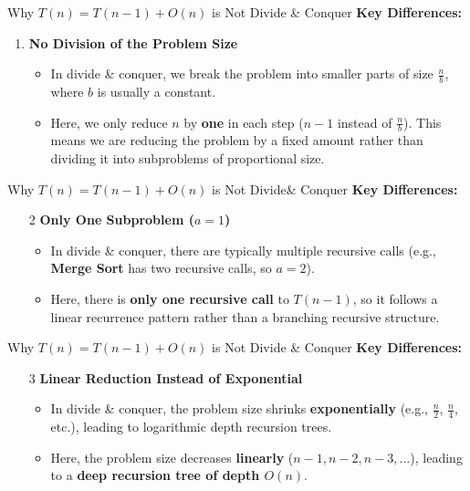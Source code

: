 \documentclass{beamer}
\begin{document}
\begin{frame}{Why $T(n) = T(n-1) + O(n)$ is Not Divide \& Conquer}
    \textbf{Key Differences:}
    \begin{enumerate}
        \item \textbf{No Division of the Problem Size}
        \begin{itemize}
            \item In divide \& conquer, we break the problem into smaller parts of size $\frac{n}{b}$, where $b$ is usually a constant.
            \item Here, we only reduce $n$ by \textbf{one} in each step ($n - 1$ instead of $\frac{n}{b}$). This means we are reducing the problem by a fixed amount rather than dividing it into subproblems of proportional size.
        \end{itemize}
    \end{enumerate}
\end{frame}

\begin{frame}{Why $T(n) = T(n-1) + O(n)$ is Not Divide\& Conquer}
    \textbf{Key Differences:}
    \begin{enumerate}
        \item[2] \textbf{Only One Subproblem ($a = 1$)}
        \begin{itemize}
            \item In divide \& conquer, there are typically multiple recursive calls (e.g., \textbf{Merge Sort} has two recursive calls, so $a = 2$).
            \item Here, there is \textbf{only one recursive call} to $T(n - 1)$, so it follows a linear recurrence pattern rather than a branching recursive structure.
        \end{itemize}
    \end{enumerate}
\end{frame}

\begin{frame}{Why $T(n) = T(n - 1) + O(n)$ is Not Divide \& Conquer}
    \textbf{Key Differences:}
    \begin{enumerate}
        \item[3] \textbf{Linear Reduction Instead of Exponential}
        \begin{itemize}
            \item In divide \& conquer, the problem size shrinks \textbf{exponentially} (e.g., $\frac{n}{2}$, $\frac{n}{4}$, etc.), leading to logarithmic depth recursion trees.
            \item Here, the problem size decreases \textbf{linearly} ($n - 1, n - 2, n - 3, \dots$), leading to a \textbf{deep recursion tree of depth $O(n)$}.
        \end{itemize}
    \end{enumerate}
\end{frame}
\end{document}
